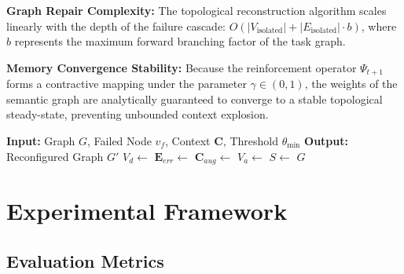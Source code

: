 \documentclass[conference]{IEEEtran}
\begin{document}
\textbf{Graph Repair Complexity:} The topological reconstruction algorithm scales linearly with the depth of the failure cascade: $O(|V_{\mathrm{isolated}}| + |E_{\mathrm{isolated}}| \cdot b)$, where $b$ represents the maximum forward branching factor of the task graph.

\textbf{Memory Convergence Stability:} Because the reinforcement operator $\Psi_{t+1}$ forms a contractive mapping under the parameter $\gamma \in (0,1)$, the weights of the semantic graph are analytically guaranteed to converge to a stable topological steady-state, preventing unbounded context explosion.

\begin{algorithm}[t]
\caption{Self-Healing DAG Reconfiguration (RephraseSubgraph)}
\label{alg:self_healing}
\begin{algorithmic}[1]
\State \textbf{Input:} Graph $G$, Failed Node $v_f$, Context $\mathbf{C}$, Threshold $\theta_{\min}$
\State \textbf{Output:} Reconfigured Graph $G'$
\Statex
\State $V_d \gets$ 
\State {}
\Statex
\State $\mathbf{E}_{err} \gets$ 
\State $\mathbf{C}_{aug} \gets$ 
\Statex
\State $V_a \gets$ 
\Statex
{}
    \State {}
    \State $S \gets$ 
\State {}
\EndFor
\Statex
{}
    \State \Return $G$
\Else
    \State \Return {}
\EndIf
\EndProcedure
\end{algorithmic}
\end{algorithm}

\section{Experimental Framework}

\subsection{Evaluation Metrics}
\end{document}
